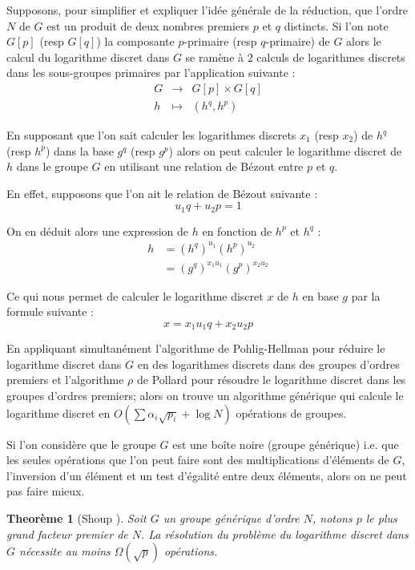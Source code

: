 \documentclass[a4paper]{article}
\newtheorem{theoreme}{Theorème}[section]
\theoremstyle{definition}
\theoremstyle{remark}
\numberwithin{equation}{section}
\begin{document}
Supposons, pour simplifier et expliquer l'idée générale de la réduction, que l'ordre $N$ de $G$ est un produit de deux nombres premiers $p$ et $q$ distincts. Si l'on note $G[p]$ (resp $G[q]$) la composante $p$-primaire (resp $q$-primaire) de $G$ alors le calcul du logarithme discret dans $G$ se ramène à $2$ calculs de logarithmes discrets dans les sous-groupes primaires par l'application suivante :
\begin{equation*}
\begin{array}{lcl}
G & \longrightarrow & G[p] \times G[q] \\
h & \longmapsto & (h^q, h^p)
\end{array}
\end{equation*}

En supposant que l'on sait calculer les logarithmes discrets $x_1$ (resp $x_2$) de $h^q$ (resp $h^p$) dans la base $g^q$ (resp $g^p$) alors on peut calculer le logarithme discret de $h$ dans le groupe $G$ en utilisant une relation de Bézout entre $p$ et $q$. 

En effet, supposons que l'on ait le relation de Bézout suivante :
$$u_1 q + u_2 p = 1$$

On en déduit alors une expression de $h$ en fonction de $h^p$ et $h^q$ :
\begin{align*}
h &= (h^q)^{u_1}(h^p)^{u_2} \\
  &= (g^q)^{x_1u_1}(g^p)^{x_2u_2}
\end{align*}

Ce qui nous permet de calculer le logarithme discret $x$ de $h$ en base $g$ par la formule suivante :
$$x = x_1 u_1 q + x_2 u_2 p$$

En appliquant simultanément l'algorithme de Pohlig-Hellman pour réduire le logarithme discret dans $G$ en des logarithmes discrets dans des groupes d'ordres premiers et l'algorithme $\rho$ de Pollard pour résoudre le logarithme discret dans les groupes d'ordres premiers; alors on trouve un algorithme générique qui calcule le logarithme discret en $O(\sum{\alpha_i\sqrt{p_i}}+\log N)$ opérations de groupes.

Si l'on considère que le groupe $G$ est une boîte noire (groupe générique) i.e. que les seules opérations que l'on peut faire sont des multiplications d'éléments de $G$, l'inversion d'un élément et un test d'égalité entre deux éléments, alors on ne peut pas faire mieux.

\begin{theoreme}[Shoup \cite{shoup}]
\label{borneShoup}
Soit $G$ un groupe générique d'ordre $N$, notons $p$ le plus grand facteur premier de $N$. La résolution du problème du logarithme discret dans $G$ nécessite au moins $\Omega(\sqrt{p})$ opérations. 
\end{theoreme}
\end{document}

